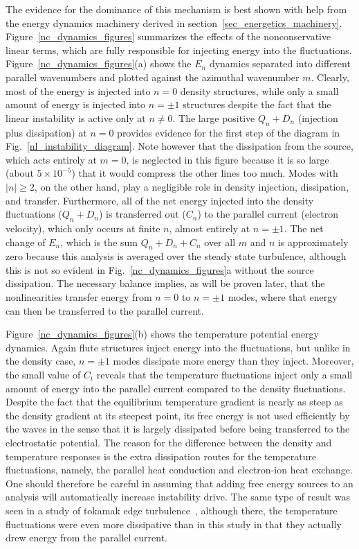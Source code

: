 \documentclass[showpacs,preprintnumbers,amsmath,amssymb,superscriptaddress,aip]{revtex4-1}
\begin{document}
The evidence for the dominance of this mechanism is best shown with
help from the energy dynamics machinery derived in section~\ref{sec_energetics_machinery}. Figure~\ref{nc_dynamics_figures} summarizes the effects of the nonconservative linear terms, which are
fully responsible for injecting energy into the fluctuations. Figure~\ref{nc_dynamics_figures}(a) shows the $E_n$ dynamics separated into different parallel wavenumbers and plotted
against the azimuthal wavenumber $m$. Clearly, most of the energy is injected into $n=0$ density structures, while only a small amount of energy is injected into
$n= \pm 1$ structures despite the fact that the linear instability is active only at $n \ne 0$. The large positive $Q_n + D_n$ (injection plus dissipation) at $n=0$ provides evidence for the first
step of the diagram in Fig.~\ref{nl_instability_diagram}. Note however that the dissipation from the source, which acts entirely at $m=0$, is neglected in this figure because it is so large 
(about $5 \times 10^{-5}$) that it would compress the other lines too much.
Modes with $|n| \ge 2$, on the other hand, play a negligible role in density injection, dissipation, and transfer. 
Furthermore, all of the net energy injected into the density fluctuations ($Q_n + D_n$) is transferred out ($C_n$) to
the parallel current (electron velocity), which only occurs at finite $n$, almost entirely at $n = \pm 1$. The net change of $E_n$, which is the sum $Q_n + D_n + C_n$ over all $m$ and $n$
is approximately zero because this analysis is averaged over the steady state turbulence, although this is not so evident in Fig.~\ref{nc_dynamics_figures}a without the source dissipation. 
The necessary balance implies, as will be proven later, that the nonlinearities transfer energy from $n=0$ to $n = \pm 1$ modes, where that energy can then
be transferred to the parallel current.

Figure~\ref{nc_dynamics_figures}(b) shows the temperature potential energy dynamics. Again flute structures inject energy into the fluctuations, but unlike in the density case, $n = \pm 1$ modes
dissipate more energy than they inject. Moreover, the small value of $C_t$ reveals that the temperature fluctuations inject only a small amount of energy into the parallel current compared
to the density fluctuations. Despite the fact that the equilibrium temperature gradient is nearly as steep as the density gradient at its steepest point, 
its free energy is not used efficiently by the waves
in the sense that it is largely dissipated before being transferred to the electrostatic potential. The reason for the difference
between the density and temperature responses is the extra dissipation routes for the temperature fluctuations, namely, the parallel heat conduction and electron-ion heat exchange.
One should therefore be careful in assuming that adding free energy sources to an analysis will automatically increase instability drive.
The same type of result was seen in a study of tokamak edge turbulence~\cite{zeiler1997}, although there, the temperature fluctuations were even more dissipative than in this study in that they
actually drew energy from the parallel current. 
\end{document}
